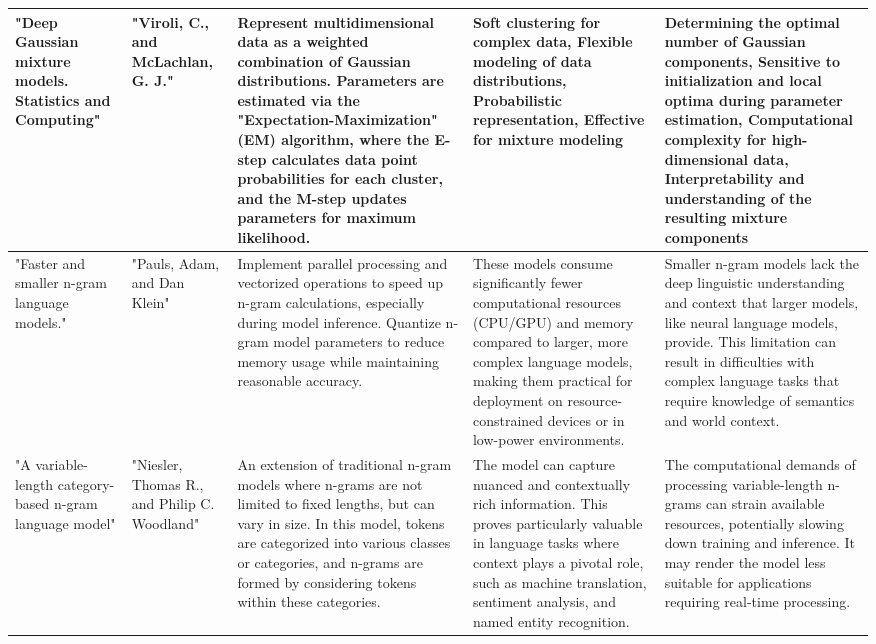 \documentclass[fleqn,10pt]{thescipub} %
\begin{document}
\begin{table}
\begin{center}
\begin{tabular}{ |p{2cm}|p{2cm}|p{3.75cm}|p{3.75cm}|p{3.5cm}| }
\hline
"Deep Gaussian mixture models. Statistics and Computing" &  "Viroli, C., and McLachlan, G. J." & Represent multidimensional data as a weighted combination of Gaussian distributions. Parameters are estimated via the "Expectation-Maximization" (EM) algorithm, where the E-step calculates data point probabilities for each cluster, and the M-step updates parameters for maximum likelihood. &  Soft clustering for complex data, Flexible modeling of data distributions, Probabilistic representation, Effective for mixture modeling &  Determining the optimal number of Gaussian components, Sensitive to initialization and local optima during parameter estimation, Computational complexity for high-dimensional data, Interpretability and understanding of the resulting mixture components \\
\hline
"Faster and smaller n-gram language models." &  "Pauls, Adam, and Dan Klein" &  Implement parallel processing and vectorized operations to speed up n-gram calculations, especially during model inference. Quantize n-gram model parameters to reduce memory usage while maintaining reasonable accuracy. &  These models consume significantly fewer computational resources (CPU/GPU) and memory compared to larger, more complex language models, making them practical for deployment on resource-constrained devices or in low-power environments. &  Smaller n-gram models lack the deep linguistic understanding and context that larger models, like neural language models, provide. This limitation can result in difficulties with complex language tasks that require knowledge of semantics and world context.  \\
\hline
"A variable-length category-based n-gram language model" &  "Niesler, Thomas R., and Philip C. Woodland" & An extension of traditional n-gram models where n-grams are not limited to fixed lengths, but can vary in size. In this model, tokens are categorized into various classes or categories, and n-grams are formed by considering tokens within these categories. &  The model can capture nuanced and contextually rich information. This proves particularly valuable in language tasks where context plays a pivotal role, such as machine translation, sentiment analysis, and named entity recognition. & The computational demands of processing variable-length n-grams can strain available resources, potentially slowing down training and inference. It may render the model less suitable for applications requiring real-time processing. \\
\hline
\end{tabular}
\end{center}
\end{table}
\end{document}
